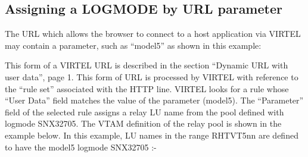 \documentclass[letterpaper,10pt,english]{sphinxmanual}
\begin{document}
\ignorespaces 

\subsection{Assigning a LOGMODE by URL parameter}
\label{\detokenize{Customization:assigning-a-logmode-by-url-parameter}}\label{\detokenize{Customization:index-68}}
The URL which allows the browser to connect to a host application via VIRTEL may contain a parameter, such as “model5” as shown in this example:

\begin{sphinxVerbatim}[commandchars=\\\{\}]
\end{sphinxVerbatim}

This form of a VIRTEL URL is described in the section “Dynamic URL with user data”, page 1. This form of URL is processed by VIRTEL with reference to the “rule set” associated with the HTTP line. VIRTEL looks for a rule whose “User Data” field matches the value of the parameter (model5). The “Parameter” field of the selected rule assigns a relay LU name from the pool defined with logmode SNX32705. The VTAM definition of the relay pool is shown in the example below. In this example, LU names in the range RHTVT5nn are defined to have the
model5 logmode SNX32705 :-
\end{document}
